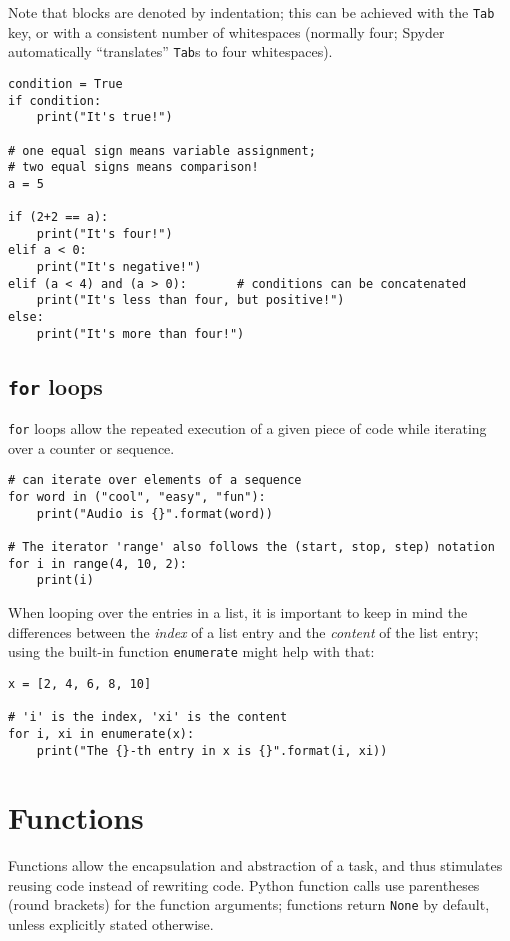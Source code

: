Note that blocks are denoted by indentation; this can be achieved with the {\tt Tab} key, or with a consistent number of whitespaces (normally four; Spyder automatically ``translates'' {\tt Tab}s to four whitespaces).

\begin{lstlisting}[frame=single]
condition = True
if condition:
    print("It's true!")

# one equal sign means variable assignment;
# two equal signs means comparison!
a = 5

if (2+2 == a):
    print("It's four!")
elif a < 0:
    print("It's negative!")
elif (a < 4) and (a > 0):		# conditions can be concatenated
    print("It's less than four, but positive!")
else:
    print("It's more than four!")
\end{lstlisting}

\subsection{{\tt for} loops}
{\tt for} loops allow the repeated execution of a given piece of code while iterating over a counter or sequence.

\begin{lstlisting}[frame=single]
# can iterate over elements of a sequence
for word in ("cool", "easy", "fun"):
    print("Audio is {}".format(word))

# The iterator 'range' also follows the (start, stop, step) notation
for i in range(4, 10, 2):
    print(i)
\end{lstlisting}

When looping over the entries in a list, it is important to keep in mind the differences between the \emph{index} of a list entry and the \emph{content} of the list entry; using the built-in function {\tt enumerate} might help with that:

\begin{lstlisting}[frame=single]
x = [2, 4, 6, 8, 10]

# 'i' is the index, 'xi' is the content
for i, xi in enumerate(x):
    print("The {}-th entry in x is {}".format(i, xi))
\end{lstlisting}

\section{Functions}

Functions allow the encapsulation and abstraction of a task, and thus stimulates reusing code instead of rewriting code. Python function calls use parentheses (round brackets) for the function arguments; functions return {\tt None} by default, unless explicitly stated otherwise.

